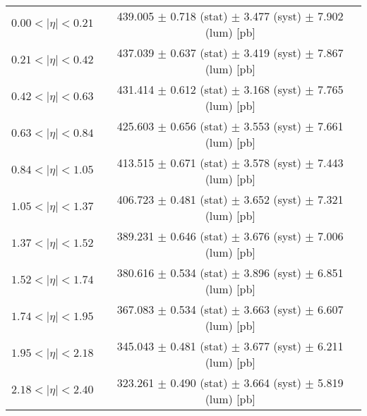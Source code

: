 \begin{tabular}{lc}
\hline
$0.00 < |\eta| <0.21$          & 439.005 $\pm$ 0.718 (stat) $\pm$ 3.477 (syst) $\pm$ 7.902 (lum) [pb]  \\
$0.21 < |\eta| <0.42$          & 437.039 $\pm$ 0.637 (stat) $\pm$ 3.419 (syst) $\pm$ 7.867 (lum) [pb]  \\
$0.42 < |\eta| <0.63$          & 431.414 $\pm$ 0.612 (stat) $\pm$ 3.168 (syst) $\pm$ 7.765 (lum) [pb]  \\
$0.63 < |\eta| <0.84$          & 425.603 $\pm$ 0.656 (stat) $\pm$ 3.553 (syst) $\pm$ 7.661 (lum) [pb]  \\
$0.84 < |\eta| <1.05$          & 413.515 $\pm$ 0.671 (stat) $\pm$ 3.578 (syst) $\pm$ 7.443 (lum) [pb]  \\
$1.05 < |\eta| <1.37$          & 406.723 $\pm$ 0.481 (stat) $\pm$ 3.652 (syst) $\pm$ 7.321 (lum) [pb]  \\
$1.37 < |\eta| <1.52$          & 389.231 $\pm$ 0.646 (stat) $\pm$ 3.676 (syst) $\pm$ 7.006 (lum) [pb]  \\
$1.52 < |\eta| <1.74$          & 380.616 $\pm$ 0.534 (stat) $\pm$ 3.896 (syst) $\pm$ 6.851 (lum) [pb]  \\
$1.74 < |\eta| <1.95$          & 367.083 $\pm$ 0.534 (stat) $\pm$ 3.663 (syst) $\pm$ 6.607 (lum) [pb]  \\
$1.95 < |\eta| <2.18$          & 345.043 $\pm$ 0.481 (stat) $\pm$ 3.677 (syst) $\pm$ 6.211 (lum) [pb]  \\
$2.18 < |\eta| <2.40$          & 323.261 $\pm$ 0.490 (stat) $\pm$ 3.664 (syst) $\pm$ 5.819 (lum) [pb]  \\
\hline
\end{tabular}
